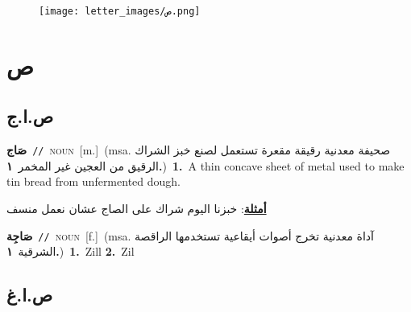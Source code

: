 \documentclass[10pt,a4paper,twoside]{article} %
\begin{document}
\begin{figure*}[t!]\centering\texttt{[image: letter\_images/ص.png]}\end{figure*}
\color{white}

 \section*{\foreignlanguage{arabic}{ص}} 
 \begin{multicols}{2} 

%
\color{black}
\vspace{-3mm}
\subsection*{\color{blue}\foreignlanguage{arabic}{ص.ا.ج}\color{blue}{ (ntws)}} 

{\setlength\topsep{0pt}\textbf{\foreignlanguage{arabic}{صَاج}}\ {\color{gray}\texttt{//}\color{black}}\ \textsc{noun}\ [m.]\ \color{gray}(msa. \foreignlanguage{arabic}{صحيفة معدنية رقيقة مقعرة تستعمل لصنع خبز الشراك الرقيق من العجين غير المخمر}~\foreignlanguage{arabic}{\textbf{١.}})\color{black}\ \textbf{1.}~A thin concave sheet of metal used to make tin bread from unfermented dough.\  \begin{flushright}\color{gray}\foreignlanguage{arabic}{\textbf{\underline{\foreignlanguage{arabic}{أمثلة}}}: خبزنا اليوم شراك على الصاج عشان نعمل منسف}\end{flushright}\color{black}} \vspace{2mm}

{\setlength\topsep{0pt}\textbf{\foreignlanguage{arabic}{صَاجِة}}\ {\color{gray}\texttt{//}\color{black}}\ \textsc{noun}\ [f.]\ \color{gray}(msa. \foreignlanguage{arabic}{آداة معدنية تخرج أصوات أيقاعية تستخدمها الراقصة الشرقية}~\foreignlanguage{arabic}{\textbf{١.}})\color{black}\ \textbf{1.}~Zill  \textbf{2.}~Zil\ 

\vspace{-3mm}
\subsection*{\color{blue}\foreignlanguage{arabic}{ص.ا.غ}\color{blue}{ (ntws)}} 

}
\end{multicols}
\end{document}
